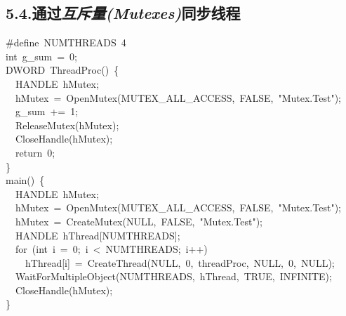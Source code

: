 \documentclass{article}
\begin{document}
\subsection{5.4.\hspace*{0.5em}通过\emph{互斥量(Mutexes)}同步线程}\label{sec--mutexes-}%
\begin{mdpre}%
\noindent\#define~{NUMTHREADS}~{4}\\
{int}~g\_sum~=~{0};\\
{DWORD}~{ThreadProc}()~\{\\
~~{HANDLE}~hMutex;\\
~~hMutex~=~{OpenMutex}({MUTEX\_ALL\_ACCESS},~{FALSE},~{"}{Mutex.Test}{"});\\
~~g\_sum~+=~{1};\\
~~{ReleaseMutex}(hMutex);\\
~~{CloseHandle}(hMutex);\\
~~{return}~{0};\\
\}\\
main()~\{\\
~~{HANDLE}~hMutex;\\
~~hMutex~=~{OpenMutex}({MUTEX\_ALL\_ACCESS},~{FALSE},~{"}{Mutex.Test}{"});\\
~~hMutex~=~{CreateMutex}({NULL},~{FALSE},~{"}{Mutex.Test}{"});\\
~~{HANDLE}~hThread[{NUMTHREADS}];\\
~~{for}~({int}~i~=~{0};~i~\textless{}~{NUMTHREADS};~i++)\\
~~~~hThread[i]~=~{CreateThread}({NULL},~{0},~threadProc,~{NULL},~{0},~{NULL});\\
~~{WaitForMultipleObject}({NUMTHREADS},~hThread,~{TRUE},~{INFINITE});\\
~~{CloseHandle}(hMutex);\\
\}%
\end{mdpre}
\end{document}

